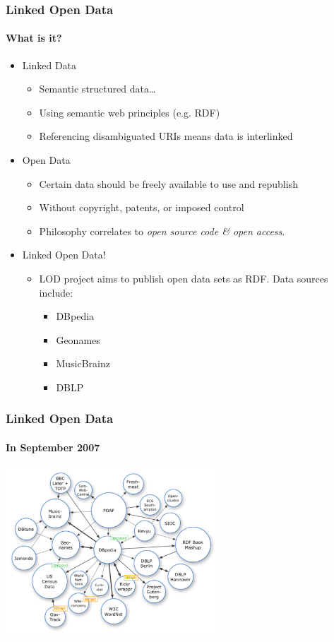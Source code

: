 \documentclass{beamer}
\begin{document}
\begin{frame}
\frametitle{Linked Open Data}
\framesubtitle{What is it?}

\begin{itemize}
\item Linked Data
  
  \begin{itemize}
  \item Semantic structured data\ldots
  \item Using semantic web principles (e.g. RDF)
  \item Referencing disambiguated URIs means data is interlinked 
  \end{itemize}
  
\pause
\item Open Data
  
  \begin{itemize}
  \item Certain data should be freely available to use and republish
  \item Without copyright, patents, or imposed control
  \item Philosophy correlates to \emph{open source code \& open access}.
  \end{itemize}
  
\pause
\item Linked Open Data!
  \begin{itemize}
  \item LOD project aims to publish open data sets as RDF. Data sources include:
    
    \begin{itemize}
    \item DBpedia
    \item Geonames
    \item MusicBrainz
    \item DBLP
    \end{itemize}
    
  \end{itemize}

\end{itemize}
\end{frame}

\begin{frame}
\frametitle{Linked Open Data}
\framesubtitle{In September 2007}

\begin{center}
\includegraphics[width=80mm]{images/lod-2007.pdf}
\end{center}

\end{frame}
\end{document}
